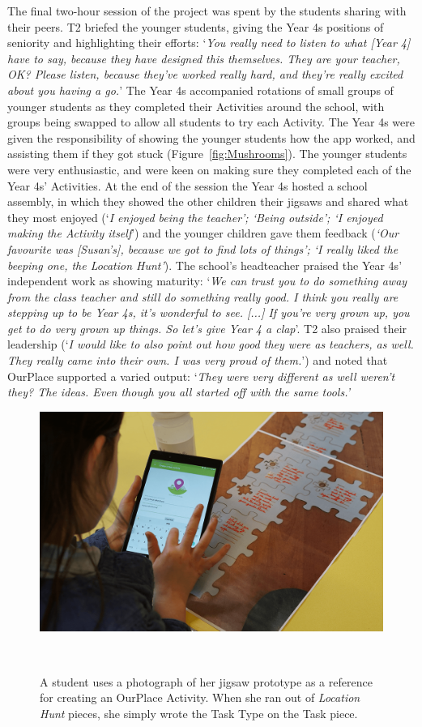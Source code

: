 The final two-hour session of the project was spent by the students sharing with their peers. T2 briefed the younger students, giving the Year 4s positions of seniority and highlighting their efforts: `\textit{You really need to listen to what [Year 4] have to say, because they have designed this themselves. They are your teacher, OK? Please listen, because they've worked really hard, and they're really excited about you having a go.}' The Year 4s accompanied rotations of small groups of younger students as they completed their Activities around the school, with groups being swapped to allow all students to try each Activity. The Year 4s were given the responsibility of showing the younger students how the app worked, and assisting them if they got stuck (Figure~\ref{fig:Mushrooms}). The younger students were very enthusiastic, and were keen on making sure they completed each of the Year 4s' Activities. At the end of the session the Year 4s hosted a school assembly, in which they showed the other children their jigsaws and shared what they most enjoyed (`\textit{I enjoyed being the teacher'; `Being outside'; `I enjoyed making the Activity itself}') and the younger children gave them feedback (\textit{`Our favourite was [Susan's], because we got to find lots of things'; `I really liked the beeping one, the Location Hunt'}). The school's headteacher praised the Year 4s' independent work as showing maturity: `\textit{We can trust you to do something away from the class teacher and still do something really good. I think you really are stepping up to be Year 4s, it's wonderful to see. [...] If you're very grown up, you get to do very grown up things. So let's give Year 4 a clap}'. T2 also praised their leadership (`\textit{I would like to also point out how good they were as teachers, as well. They really came into their own. I was very proud of them.}') and noted that OurPlace supported a varied output: `\textit{They were very different as well weren't they? The ideas. Even though you all started off with the same tools.'}

\begin{figure}
\centering
  \includegraphics[width=0.7\columnwidth]{images/chapter08/jigsawToApp}
  \caption{A student uses a photograph of her jigsaw prototype as a reference for creating an OurPlace Activity. When she ran out of \textit{Location Hunt} pieces, she simply wrote the Task Type on the Task piece.}~\label{fig:JigsawToApp}
\end{figure}

